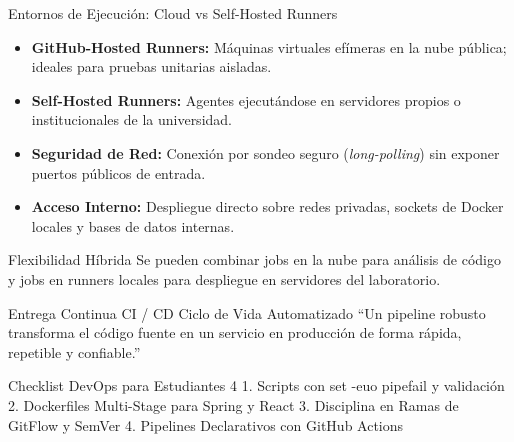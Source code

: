 \documentclass[aspectratio=169]{beamer}
\begin{document}
\contentSlideBulletCard
  {Entornos de Ejecución: Cloud vs Self-Hosted Runners}
  {
    \begin{itemize}
      \item \textbf{GitHub-Hosted Runners:} Máquinas virtuales efímeras en la nube pública; ideales para pruebas unitarias aisladas.
      \item \textbf{Self-Hosted Runners:} Agentes ejecutándose en servidores propios o institucionales de la universidad.
      \item \textbf{Seguridad de Red:} Conexión por sondeo seguro (\textit{long-polling}) sin exponer puertos públicos de entrada.
      \item \textbf{Acceso Interno:} Despliegue directo sobre redes privadas, sockets de Docker locales y bases de datos internas.
    \end{itemize}
  }
  {Flexibilidad Híbrida}
  {Se pueden combinar jobs en la nube para análisis de código y jobs en runners locales para despliegue en servidores del laboratorio.}

\contentSlideQuoteStat
  {Entrega Continua}
  {CI / CD}
  {Ciclo de Vida Automatizado}
  {“Un pipeline robusto transforma el código fuente en un servicio en producción de forma rápida, repetible y confiable.”}

\agendaSlideProgress
  {Checklist DevOps para Estudiantes}
  {4}
  {1. Scripts con set -euo pipefail y validación}
  {2. Dockerfiles Multi-Stage para Spring y React}
  {3. Disciplina en Ramas de GitFlow y SemVer}
  {4. Pipelines Declarativos con GitHub Actions}
\end{document}
